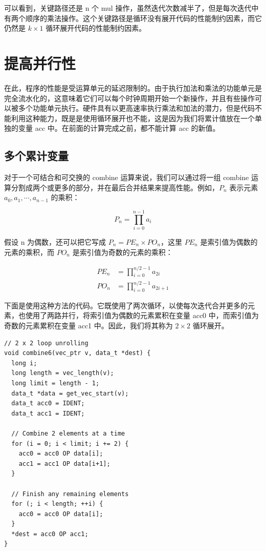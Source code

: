 可以看到，关键路径还是 n 个 mul 操作，虽然迭代次数减半了，但是每次迭代中有两个顺序的乘法操作。这个关键路径是循环没有展开代码的性能制约因素，而它仍然是 $k \times 1$ 循环展开代码的性能制约因素。

\section{提高并行性}

在此，程序的性能是受运算单元的延迟限制的。由于执行加法和乘法的功能单元是完全流水化的，这意味着它们可以每个时钟周期开始一个新操作，并且有些操作可以被多个功能单元执行。硬件具有以更高速率执行乘法和加法的潜力，但是代码不能利用这种能力，既是是使用循环展开也不能，这是因为我们将累计值放在一个单独的变量 acc 中。在前面的计算完成之前，都不能计算 acc 的新值。

\subsection{多个累计变量}

对于一个可结合和可交换的 combine 运算来说，我们可以通过将一组 combine 运算分割成两个或更多的部分，并在最后合并结果来提高性能。例如，$P_n$ 表示元素 $a_0, a_1, \cdots, a_{n-1}$ 的乘积：

\[
    P_n = \prod_{i=0}^{n-1} a_i
\]

假设 n 为偶数，还可以把它写成 $P_n = PE_n \times PO_n$，这里 $PE_n$ 是索引值为偶数的元素的乘积，而 $PO_n$ 是索引值为奇数的元素的乘积：

\begin{align*}
    PE_n & = \prod_{i=0}^{n/2-1} a_{2i} \\
    PO_n & = \prod_{i=0}^{n/2-1} a_{2i+1}
\end{align*}

下面是使用这种方法的代码。它既使用了两次循环，以使每次迭代合并更多的元素，也使用了两路并行，将索引值为偶数的元素累积在变量 acc0 中，而索引值为奇数的元素累积在变量 acc1 中。因此，我们将其称为 $2 \times 2$ 循环展开。

\begin{verbatim}
// 2 x 2 loop unrolling
void combine6(vec_ptr v, data_t *dest) {
  long i;
  long length = vec_length(v);
  long limit = length - 1;
  data_t *data = get_vec_start(v);
  data_t acc0 = IDENT;
  data_t acc1 = IDENT;

  // Combine 2 elements at a time
  for (i = 0; i < limit; i += 2) {
    acc0 = acc0 OP data[i];
    acc1 = acc1 OP data[i+1];
  }

  // Finish any remaining elements
  for (; i < length; ++i) {
    acc0 = acc0 OP data[i];
  }
  *dest = acc0 OP acc1;
}
\end{verbatim}

